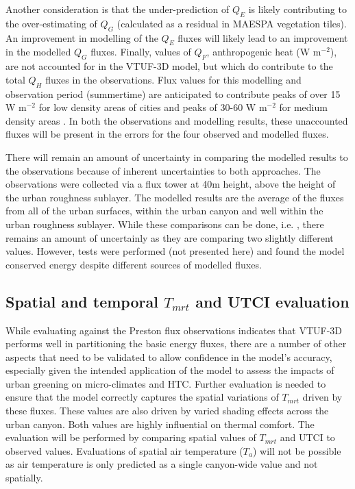 \documentclass[final,3p,times,authoryear]{elsarticle}
\begin{document}
Another consideration is that the under-prediction of $Q_{E}$ is likely contributing to the over-estimating of $Q_{G}$ (calculated as a residual in MAESPA vegetation tiles). An improvement in modelling of the $Q_{E}$ fluxes will likely lead to an improvement in the modelled $Q_{G}$ fluxes. Finally, values of $Q_{F}$, anthropogenic heat (W m$^{-2}$), are not accounted for in the VTUF-3D model, but which do contribute to the total $Q_{H}$ fluxes in the observations. Flux values for this modelling and observation period (summertime) are anticipated to contribute peaks of over 15 W m$^{-2}$ for low density areas of cities and peaks of 30-60 W m$^{-2}$ for medium density areas \citep{Sailor2004}. In both the observations and modelling results, these unaccounted fluxes will be present in the errors for the four observed and modelled fluxes. 



There will remain an amount of uncertainty in comparing the modelled results to the observations because of inherent uncertainties to both approaches. The observations were collected via a flux tower at 40m height, above the height of the urban roughness sublayer. The modelled results are the average of the fluxes from all of the urban surfaces, within the urban canyon and well within the urban roughness sublayer. While these comparisons can be done, i.e. \cite{Grimmond2011}, there remains an amount of uncertainly as they are comparing two slightly different values. However, tests were performed (not presented here) and found the model conserved energy despite different sources of modelled fluxes.



\subsection{Spatial and temporal $T_{mrt}$ and UTCI evaluation}\label{sec:CoMValidations}

While evaluating against the Preston flux observations indicates that VTUF-3D performs well in partitioning the basic energy fluxes, there are a number of other aspects that need to be validated to allow confidence in the model's accuracy, especially given the intended application of the model to assess the impacts of urban greening on micro-climates and HTC. Further evaluation is needed to ensure that the model correctly captures the spatial variations of $T_{mrt}$ driven by these fluxes. These values are also driven by varied shading effects across the urban canyon. Both values are highly influential on thermal comfort. The evaluation will be performed by comparing spatial values of $T_{mrt}$ and UTCI to observed values. Evaluations of spatial air temperature ($T_{a}$) will not be possible as air temperature is only predicted as a single canyon-wide value and not spatially.
\end{document}
